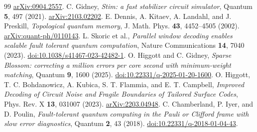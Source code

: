 \documentclass[11pt,a4paper]{article}
\begin{document}
\begin{thebibliography}{99}
\href{https://arxiv.org/abs/0904.2557}{arXiv:0904.2557}.
 C. Gidney, \emph{Stim: a fast stabilizer circuit simulator}, Quantum \textbf{5}, 497 (2021).\newline
\href{https://arxiv.org/abs/2103.02202}{arXiv:2103.02202}.
 E. Dennis, A. Kitaev, A. Landahl, and J. Preskill, \emph{Topological quantum memory}, J. Math. Phys. \textbf{43}, 4452--4505 (2002).\newline
\href{https://arxiv.org/abs/quant-ph/0110143}{arXiv:quant-ph/0110143}.
 L. Skoric et al., \emph{Parallel window decoding enables scalable fault tolerant quantum computation}, Nature Communications \textbf{14}, 7040 (2023).\newline
\href{https://www.nature.com/articles/s41467-023-42482-1}{doi:10.1038/s41467-023-42482-1}.
 O. Higgott and C. Gidney, \emph{Sparse Blossom: correcting a million errors per core second with minimum-weight matching}, Quantum \textbf{9}, 1600 (2025).\newline
\href{https://quantum-journal.org/papers/q-2025-01-20-1600/}{doi:10.22331/q-2025-01-20-1600}.
 O. Higgott, T. C. Bohdanowicz, A. Kubica, S. T. Flammia, and E. T. Campbell, \emph{Improved Decoding of Circuit Noise and Fragile Boundaries of Tailored Surface Codes}, Phys. Rev. X \textbf{13}, 031007 (2023).\newline
\href{https://arxiv.org/abs/2203.04948}{arXiv:2203.04948}.
 C. Chamberland, P. Iyer, and D. Poulin, \emph{Fault-tolerant quantum computing in the Pauli or Clifford frame with slow error diagnostics}, Quantum \textbf{2}, 43 (2018).\newline
\href{https://quantum-journal.org/papers/q-2018-01-04-43/}{doi:10.22331/q-2018-01-04-43}.
\end{thebibliography}
\end{document}
